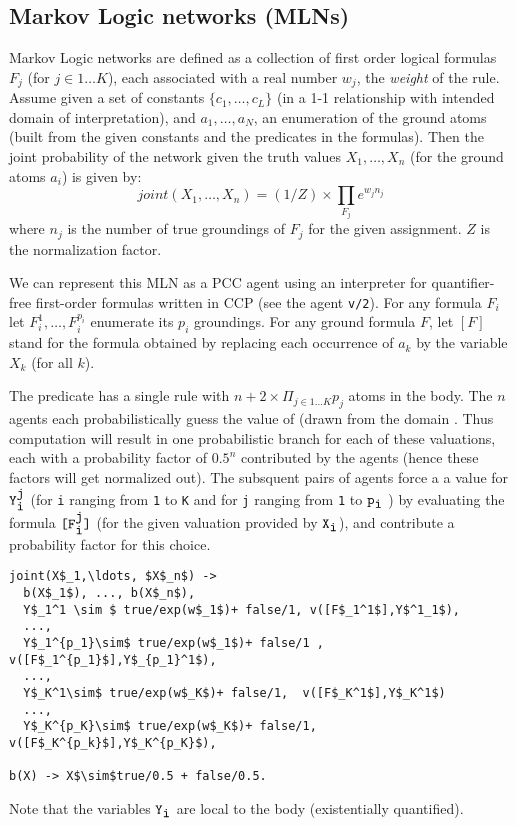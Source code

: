 \subsection{Markov Logic networks (MLNs)}
Markov Logic networks \cite{markovLogicNetworks} are defined as a collection of first order logical formulas \(F_j\) (for \(j\in 1\ldots K\)), each associated with a real number \(w_j\), the {\em weight} of the rule. Assume given a set of constants \(\{c_1,\ldots, c_L\}\) (in a 1-1 relationship with intended domain of interpretation), and \(a_1,\ldots, a_N\), an enumeration of the ground atoms (built from the given constants and the predicates in the formulas). Then the joint probability of the network given the truth values \(X_1, \ldots, X_n\) (for the ground atoms \(a_i\)) is given by:
\[ joint(X_1,\ldots, X_n)= (1/Z)\times \prod_{F_j} e^{w_j n_j}
\]
\noindent where \(n_j\) is the number of true groundings of \(F_j\) for the given assignment. \(Z\) is the normalization factor.

We can represent this MLN as a PCC agent  using an interpreter for quantifier-free first-order formulas written in CCP (see the agent {\tt v/2}). 
For any formula \(F_i\) let \(F_i^1, \ldots, F_i^{p_i}\) enumerate its \(p_i\) groundings. For any ground formula \(F\), let \([F]\) stand for the formula obtained by replacing each occurrence of \(a_k\) by the variable \(X_k\) (for all \(k\)). 

The predicate  has a single rule with \(n+2\times\Pi_{j\in 1\ldots K} p_j\) atoms in the body. The \(n\)  agents each probabilistically guess the value of  (drawn from the domain . Thus computation will result in one probabilistic branch for each of these valuations, each with a probability factor of \(0.5^{n}\) contributed by the  agents (hence these factors will get normalized out). The subsquent pairs of agents force a a value for \(\mbox{\tt Y}_{\mbox{\tt i}}^{\mbox{\tt j}}\) (for {\tt i} ranging from {\tt 1} to {\tt K} and for {\tt j} ranging from {\tt 1} to \(\mbox{\tt p}_{\mbox{\tt i}}\) ) by evaluating the formula \(\mbox{\tt [F}_{\mbox{\tt i}}^{\mbox{\tt j}}\mbox{\tt ]}\) (for the given valuation provided by \(\mbox{\tt X}_{\mbox{\tt i}}\)), and contribute a probability factor for this choice. 
\begin{lstlisting}[mathescape=true]
joint(X$_1,\ldots, $X$_n$) ->
  b(X$_1$), ..., b(X$_n$),
  Y$_1^1 \sim $ true/exp(w$_1$)+ false/1, v([F$_1^1$],Y$^1_1$),
  ...,
  Y$_1^{p_1}\sim$ true/exp(w$_1$)+ false/1 , v([F$_1^{p_1}$],Y$_{p_1}^1$),
  ...,
  Y$_K^1\sim$ true/exp(w$_K$)+ false/1,  v([F$_K^1$],Y$_K^1$)
  ...,
  Y$_K^{p_K}\sim$ true/exp(w$_K$)+ false/1,  v([F$_K^{p_k}$],Y$_K^{p_K}$),
	
b(X) -> X$\sim$true/0.5 + false/0.5.
\end{lstlisting}
\noindent Note that the variables \(\mbox{\tt Y}_{\mbox{\tt i}}\) are local to the body (existentially quantified).

